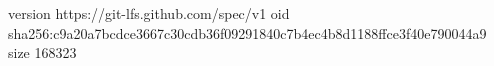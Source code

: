 version https://git-lfs.github.com/spec/v1
oid sha256:c9a20a7bcdce3667c30cdb36f09291840c7b4ec4b8d1188ffce3f40e790044a9
size 168323

